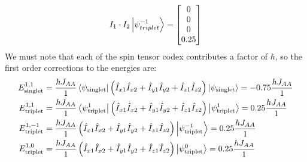 \documentclass[12pt]{article}
\begin{document}
\begin{equation}
  I_1 \cdot I_2 \ket{\psi_{triplet}^{-1}} = \left[\begin{matrix}0\\0\\0\\0.25\end{matrix}\right]
\end{equation}
We must note that each of the spin tensor codex contributes a factor of $\hbar$, so the first order corrections to the energies are:
\begin{align*}
  E_{\text{singlet}}^{1,1} &= \frac{h J_{AA}}{1} \bra{\psi_{\text{singlet}}}\left(\hat{I}_{x1} \hat{I}_{x2} + \hat{I}_{y1} \hat{I}_{y2} + \hat{I}_{z1} \hat{I}_{z2}\right) \ket{\psi_{\text{singlet}}} = -0.75 \frac{h J_{AA}}{1}\\
  E_{\text{triplet}}^{1,1} &= \frac{h J_{AA}}{1} \bra{\psi_{\text{triplet}}^{1}}\left(\hat{I}_{x1} \hat{I}_{x2} + \hat{I}_{y1} \hat{I}_{y2} + \hat{I}_{z1} \hat{I}_{z2}\right) \ket{\psi_{\text{triplet}}^{1}} = 0.25 \frac{h J_{AA}}{1}\\
  E_{\text{triplet}}^{1,-1} &= \frac{h J_{AA}}{1} \left(\hat{I}_{x1} \hat{I}_{x2} + \hat{I}_{y1} \hat{I}_{y2} + \hat{I}_{z1} \hat{I}_{z2}\right) \ket{\psi_{\text{triplet}}^{-1}} = 0.25 \frac{h J_{AA}}{1}\\
  E_{\text{triplet}}^{1,0} &= \frac{h J_{AA}}{1} \left(\hat{I}_{x1} \hat{I}_{x2} + \hat{I}_{y1} \hat{I}_{y2} + \hat{I}_{z1} \hat{I}_{z2}\right) \ket{\psi_{\text{triplet}}^{0}} = 0.25 \frac{h J_{AA}}{1}
\end{align*}
\end{document}
